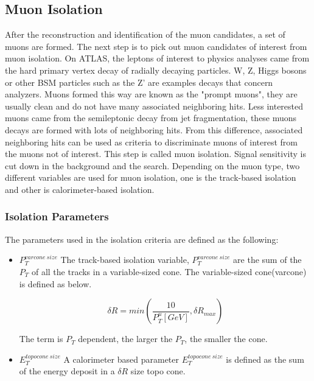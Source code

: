 \subsection{Muon Isolation}
After the reconstruction and identification of the muon candidates, a set of muons are formed. The next step is to pick out muon candidates of interest from muon isolation. On ATLAS, the leptons of interest to physics analyses came from the hard primary vertex decay of radially decaying particles. W, Z, Higgs bosons or other BSM particles such as the Z' are examples decays that concern analyzers. Muons formed this way are known as the "prompt muons", they are usually clean and do not have many associated neighboring hits. Less interested muons came from the semileptonic decay from jet fragmentation, these muons decays are formed with lots of neighboring hits. From this difference, associated neighboring hits can be used as criteria to discriminate muons of interest from the muons not of interest. This step is called muon isolation. Signal sensitivity is cut down in the background and the search. Depending on the muon type, two different variables are used for muon isolation, one is the track-based isolation and other is calorimeter-based isolation.

\subsubsection*{Isolation Parameters}
The parameters used in the isolation criteria are defined as the following:
\begin{itemize}
    \item  $P_{T}^{varcone\:size}$ \newline
        The track-based isolation variable, $P_{T}^{varcone\:size}$ are the sum of the $P_{T}$ of all the tracks in a variable-sized cone. The variable-sized cone(varcone) is defined as below.

    
\begin{equation}
 \delta R = min(\frac{10}{P^{\mu}_{T}[GeV]}, \delta R_{max}) 
 \end{equation}

The term is $P_{T}$ dependent, the larger the $P_{T}$, the smaller the cone. 
    \item $E^{topocone\:size}_{T}$ \newline
        A calorimeter based parameter $E^{topocone\:size}_T$ is defined as the sum of the energy deposit in a $\delta R$ size topo cone. 

\end{itemize}

